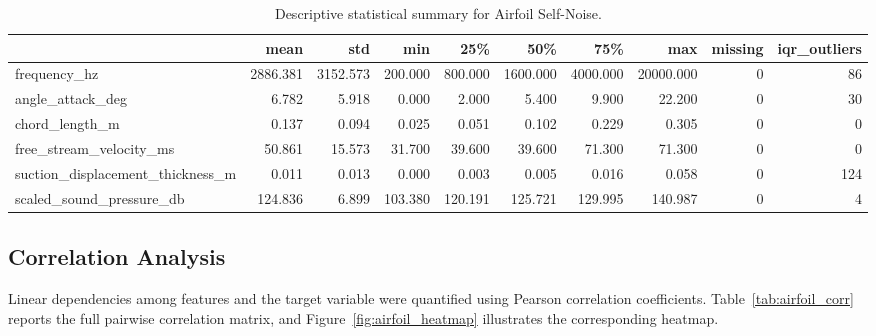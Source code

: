 \documentclass[11pt]{article}
\begin{document}
\begin{table}[H]
\centering
\small
\begin{tabular}{lrrrrrrrrr}
\toprule
 & mean & std & min & 25\% & 50\% & 75\% & max & missing & iqr\_outliers \\
\midrule
frequency\_hz & 2886.381 & 3152.573 & 200.000 & 800.000 & 1600.000 & 4000.000 & 20000.000 & 0 & 86 \\
angle\_attack\_deg & 6.782 & 5.918 & 0.000 & 2.000 & 5.400 & 9.900 & 22.200 & 0 & 30 \\
chord\_length\_m & 0.137 & 0.094 & 0.025 & 0.051 & 0.102 & 0.229 & 0.305 & 0 & 0 \\
free\_stream\_velocity\_ms & 50.861 & 15.573 & 31.700 & 39.600 & 39.600 & 71.300 & 71.300 & 0 & 0 \\
suction\_displacement\_thickness\_m & 0.011 & 0.013 & 0.000 & 0.003 & 0.005 & 0.016 & 0.058 & 0 & 124 \\
scaled\_sound\_pressure\_db & 124.836 & 6.899 & 103.380 & 120.191 & 125.721 & 129.995 & 140.987 & 0 & 4 \\
\bottomrule
\end{tabular}

\caption{Descriptive statistical summary for Airfoil Self-Noise.}
\label{tab:airfoil_summary}
\end{table}

\subsection{Correlation Analysis}
Linear dependencies among features and the target variable were quantified using Pearson correlation coefficients. Table~\ref{tab:airfoil_corr} reports the full pairwise correlation matrix, and Figure~\ref{fig:airfoil_heatmap} illustrates the corresponding heatmap.

\begin{table}[H]
\centering
\small
{}
\caption{Pearson correlation matrix for Airfoil Self-Noise.}
\label{tab:airfoil_corr}
\end{table}
\end{document}
